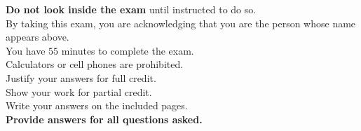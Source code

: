 \documentclass{ximera}
\begin{document}

\vspace{1cm}

{\Large
  \noindent \textbf{Do not look inside the exam} until instructed to do so.\\[1em]
  \noindent By taking this exam, you are acknowledging that you are the person whose name appears above.\\[1em]
\noindent You have $55$ minutes to complete the exam.\\[1em]
\noindent Calculators or cell phones are prohibited.\\[1em]
\noindent Justify your answers for full credit.\\[1em]
\noindent Show your work for partial credit.\\[1em]
\noindent Write your answers on the included pages.\\[1em]
\noindent \textbf{Provide answers for all questions asked.}
}
\end{document}
